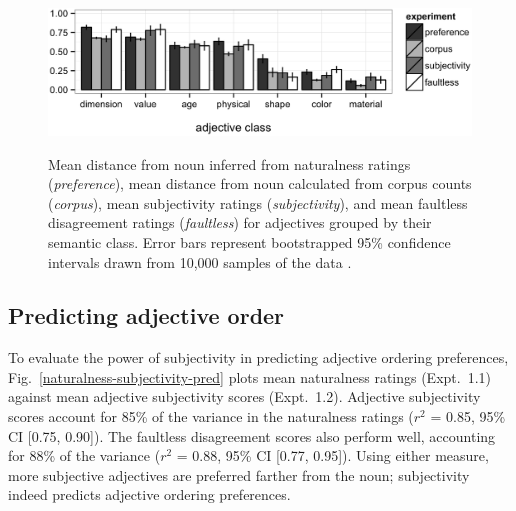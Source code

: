\documentclass[12pt]{article}
\newcommand{\gcs}[1]{\textcolor{blue}{[gcs: #1]}}
\begin{document}
\begin{figure}
	\centering
	{\includegraphics[width=.75\linewidth]{plots/expt_results-new.eps}}\par
	\caption{Mean distance from noun inferred from naturalness ratings (\emph{preference}), mean distance from noun calculated from corpus counts (\emph{corpus}), mean subjectivity ratings (\emph{subjectivity}), and mean faultless disagreement ratings (\emph{faultless}) for adjectives grouped by their semantic class. Error bars represent bootstrapped 95\% confidence intervals drawn from 10,000 samples of the data \citep{DiCiccio1996}.}\label{results}
\end{figure}


\subsection{Predicting adjective order}

To evaluate the power of subjectivity in predicting adjective ordering preferences, Fig.~\ref{naturalness-subjectivity-pred} plots mean naturalness ratings (Expt.~1.1) against mean adjective subjectivity scores (Expt.~1.2). Adjective subjectivity scores account for  85\% of the variance in the naturalness ratings ($r^2$ = 0.85, 95\% CI [0.75, 0.90]).
The faultless disagreement scores also perform well, accounting for 88\% of the variance ($r^2$ = 0.88, 95\% CI [0.77, 0.95]).  
Using either measure, more subjective adjectives are preferred farther from the noun; subjectivity indeed predicts adjective ordering preferences.
\end{document}
